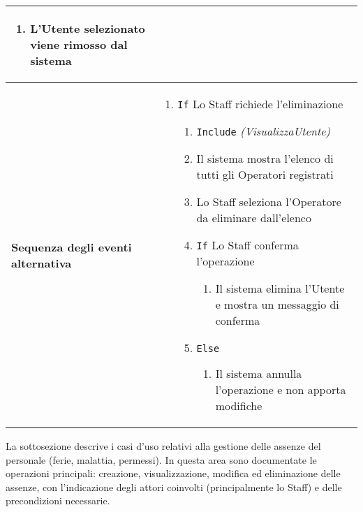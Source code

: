 \documentclass[a4paper]{report}
\begin{document}
\begin{table}[H]
\begin{tabular}{|p{3.9cm}|p{9.9cm}|}
\begin{enumerate}[leftmargin=14pt,label=\arabic*.,labelsep=0.5em,topsep=0pt,partopsep=0pt,parsep=0pt,itemsep=0pt]
\begin{enumerate}[label=\arabic{enumi}.\arabic*.,leftmargin=22pt,labelsep=0.5em,topsep=0pt,partopsep=0pt,parsep=0pt,itemsep=0pt]
        \item L’Utente selezionato viene rimosso dal sistema
    \end{enumerate}
\end{enumerate} \\ \hline
\textbf{Sequenza degli eventi alternativa} & \begin{enumerate}[leftmargin=14pt,label=\arabic*.,labelsep=0.5em,topsep=0pt,partopsep=0pt,parsep=0pt,itemsep=0pt] 
    \item \texttt{If} Lo Staff richiede l'eliminazione
    \begin{enumerate}[label=\arabic{enumi}.\arabic*.,leftmargin=22pt,labelsep=0.5em,topsep=0pt,partopsep=0pt,parsep=0pt,itemsep=0pt]
        \item \texttt{Include} \textit{(VisualizzaUtente)} 
        \item Il sistema mostra l’elenco di tutti gli Operatori registrati
        \item Lo Staff seleziona l’Operatore da eliminare dall’elenco
        \item \texttt{If} Lo Staff conferma l’operazione
        \begin{enumerate}[label=\arabic{enumi}.\arabic*.,leftmargin=22pt,labelsep=0.5em,topsep=0pt,partopsep=0pt,parsep=0pt,itemsep=0pt]
            \item Il sistema elimina l’Utente e mostra un messaggio di conferma
        \end{enumerate}
        \item \texttt{Else}
        \begin{enumerate}[label=\arabic{enumi}.\arabic*.,leftmargin=22pt,labelsep=0.5em,topsep=0pt,partopsep=0pt,parsep=0pt,itemsep=0pt]
            \item Il sistema annulla l’operazione e non apporta modifiche
        \end{enumerate}
    \end{enumerate}
\end{enumerate}\\ \hline
\end{tabular}
\end{table}



\clearpage
{}

La sottosezione descrive i casi d'uso relativi alla gestione delle assenze del personale (ferie, malattia, permessi). In questa area sono documentate le operazioni principali: creazione, visualizzazione, modifica ed eliminazione delle assenze, con l'indicazione degli attori coinvolti (principalmente lo Staff) e delle precondizioni necessarie.
\end{document}
